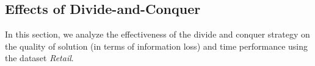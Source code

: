 
\subsection{Effects of Divide-and-Conquer}\label{sec:eval:effect}
In this section, we analyze the effectiveness of the divide and conquer
strategy on the quality of solution (in terms of information loss) and time
performance using the dataset {\em Retail}.
%
%
